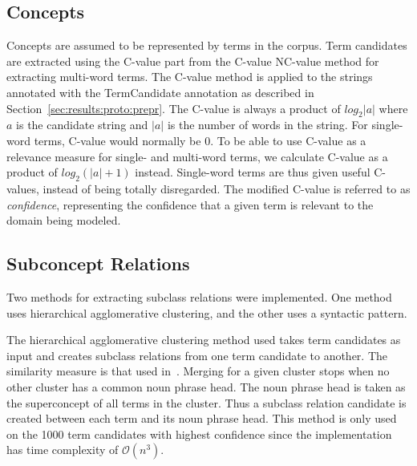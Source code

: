 \documentclass[a4paper]{report}
\begin{document}
\subsection{Concepts}

Concepts are assumed to be represented by terms in the corpus.
Term candidates are extracted using the C-value part from the C-value NC-value method for extracting multi-word terms.
The C-value method is applied to the strings annotated with the TermCandidate annotation as described in Section~\ref{sec:results:proto:prepr}.
The C-value is always a product of \(log_{2} |a|\) where \(a\) is the candidate string and \(|a|\) is the number of words in the string.
For single-word terms, C-value would normally be \(0\).
To be able to use C-value as a relevance measure for single- and multi-word terms, we calculate C-value as a product of \(log_{2} (|a|+1)\) instead.
Single-word terms are thus given useful C-values, instead of being totally disregarded.
The modified C-value is referred to as \emph{confidence}, representing the confidence that a given term is relevant to the domain being modeled.

\subsection{Subconcept Relations}

Two methods for extracting subclass relations were implemented.
One method uses hierarchical agglomerative clustering, and the other uses a syntactic pattern.

The hierarchical agglomerative clustering method used takes term candidates as input and creates subclass relations from one term candidate to another.
The similarity measure is that used in~\cite{Drymonas10OntoGain}.
Merging for a given cluster stops when no other cluster has a common noun phrase head.
The noun phrase head is taken as the superconcept of all terms in the cluster.
Thus a subclass relation candidate is created between each term and its noun phrase head.
This method is only used on the 1000 term candidates with highest confidence since the implementation has time complexity of \(\mathcal{O}(n^{3})\).
\end{document}
